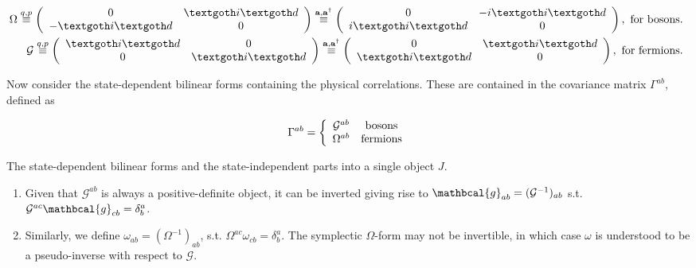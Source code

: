 \documentclass{homework}
\begin{document}
\begin{equation}
\begin{split}
    \Omega \overset{q,p}{\equiv} \left(
        \begin{array}{cc}
            0 & \id \\
            -\id & 0 
        \end{array} 
    \right) \overset{{\bf a}, {\bf a}^{\dagger}}{\equiv} \left(
        \begin{array}{cc}
            0 & -i\id \\
            i\id & 0 
        \end{array} 
    \right), \textnormal{ for bosons. } \\
    \mathcal{G} \overset{q,p}{\equiv} \left(
        \begin{array}{cc}
            \id & 0 \\
            0 & \id 
        \end{array} 
    \right) \overset{{\bf a}, {\bf a}^{\dagger}}{\equiv} \left(
        \begin{array}{cc}
            0 & \id \\
            \id & 0 
        \end{array} 
    \right), \textnormal{ for fermions. }
\end{split}
\end{equation}

Now consider the state-dependent bilinear forms containing the physical correlations. These are contained in the covariance matrix $\Gamma^{ab}$, defined as 

\begin{equation}
    \Gamma^{ab} = \left\{ 
          \begin{array}{cc}
               \mathcal{G}^{ab} & \textnormal{bosons} \\
               \Omega^{ab} & \textnormal{fermions}
          \end{array}
    \right.
\end{equation}

The state-dependent bilinear forms and the state-independent parts into a single object $J$. 

\begin{enumerate}
    \item Given that $\mathcal{G}^{ab}$ is always a positive-definite object, it can be inverted giving rise to $\mathbcal{g}_{ab} = (\mathcal{G}^{-1})_{ab}$ s.t. $\mathcal{G}^{ac} \mathbcal{g}_{cb}= \delta^{a}_b$. 
    \item Similarly, we define $\omega_{ab} = (\Omega^{-1})_{ab}$, s.t. $\Omega^{ac}\omega_{cb} = \delta^{a}_b$. The symplectic $\Omega$-form may not be invertible, in which case $\omega$ is understood to be a pseudo-inverse with respect to $\mathcal{G}$.
\end{enumerate}
\end{document}
